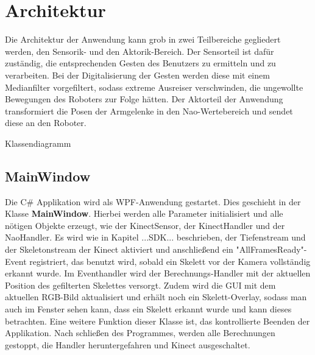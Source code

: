 %
%
\section{Architektur}\label{k:Architektur}
Die Architektur der Anwendung kann grob in zwei Teilbereiche gegliedert werden, den Sensorik- und den Aktorik-Bereich.
Der Sensorteil ist dafür zuständig, die entsprechenden Gesten des Benutzers zu ermitteln und zu verarbeiten. Bei der Digitalisierung der Gesten werden diese mit einem Medianfilter vorgefiltert, sodass extreme Ausreiser verschwinden, die ungewollte Bewegungen des Roboters zur Folge hätten.
Der Aktorteil der Anwendung transformiert die Posen der Armgelenke in den Nao-Wertebereich und sendet diese an den Roboter.

%
%
%

Klassendiagramm

\subsection{MainWindow}
Die C\# Applikation wird als WPF-Anwendung gestartet. Dies geschieht in der Klasse \textbf{MainWindow}. Hierbei werden alle Parameter initialisiert und alle nötigen Objekte erzeugt, wie der KinectSensor, der KinectHandler und der NaoHandler. Es wird wie in Kapitel ...SDK... beschrieben, der Tiefenstream und der Skeletonstream der Kinect aktiviert und anschließend ein "AllFramesReady"-Event registriert, das benutzt wird, sobald ein Skelett vor der Kamera vollständig erkannt wurde. Im Eventhandler wird der Berechnungs-Handler mit der aktuellen Position des gefilterten Skelettes versorgt. Zudem wird die GUI mit dem aktuellen RGB-Bild aktualisiert und erhält noch ein Skelett-Overlay, sodass man auch im Fenster sehen kann, dass ein Skelett erkannt wurde und kann dieses betrachten. Eine weitere Funktion dieser Klasse ist, das kontrollierte Beenden der Applikation. Nach schließen des Programmes, werden alle Berechnungen gestoppt, die Handler heruntergefahren und Kinect ausgeschaltet.

